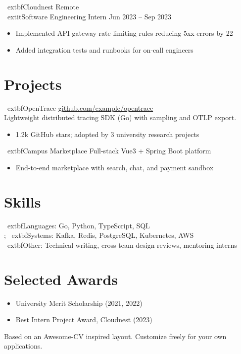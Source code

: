 \documentclass[11pt,a4paper]{article}
\begin{document}
\	extbf{Cloudnest} \hfill Remote\\
\	extit{Software Engineering Intern} \hfill Jun 2023 -- Sep 2023
\begin{itemize}
  \item Implemented API gateway rate-limiting rules reducing 5xx errors by 22\\%
  \item Added integration tests and runbooks for on-call engineers
\end{itemize}

\section{Projects}
\	extbf{OpenTrace} \hfill \href{https://github.com/example/opentrace}{github.com/example/opentrace}\\
Lightweight distributed tracing SDK (Go) with sampling and OTLP export.
\begin{itemize}
  \item 1.2k GitHub stars; adopted by 3 university research projects
\end{itemize}

\	extbf{Campus Marketplace} \hfill Full-stack Vue3 + Spring Boot platform\\
\begin{itemize}
  \item End-to-end marketplace with search, chat, and payment sandbox
\end{itemize}

\section{Skills}
\	extbf{Languages:} Go, Python, TypeScript, SQL \\;
\	extbf{Systems:} Kafka, Redis, PostgreSQL, Kubernetes, AWS \\
\	extbf{Other:} Technical writing, cross-team design reviews, mentoring interns

\section{Selected Awards}
\begin{itemize}
  \item University Merit Scholarship (2021, 2022)
  \item Best Intern Project Award, Cloudnest (2023)
\end{itemize}

\vspace{0.6em}
{\small\color{muted}Based on an Awesome-CV inspired layout. Customize freely for your own applications.}
\end{document}
